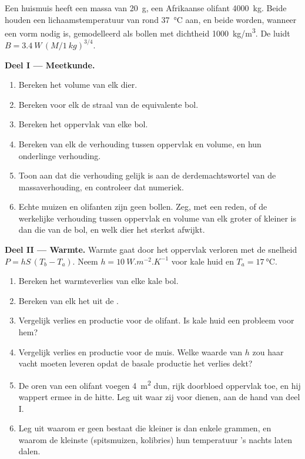 \begin{problem}
\label{pb:b1:organism-environment:1}
Een huismuis heeft een massa van \qty{20}{g}, een Afrikaanse olifant
\qty{4000}{kg}. Beide houden een lichaamstemperatuur van rond \qty{37}{\celsius}
aan, en beide worden, wanneer een vorm nodig is, gemodelleerd als bollen met
dichtheid \qty{1000}{kg/m^3}. De  luidt $B = \qty{3.4}{W}\,(M/\qty{1}{kg})^{3/4}$.

\medskip
\noindent\textbf{Deel I --- Meetkunde.}
\begin{enumerate}
  \item Bereken het volume van elk dier.
  \item Bereken voor elk de straal van de equivalente bol.
  \item Bereken het oppervlak van elke bol.
  \item Bereken van elk de verhouding tussen oppervlak en volume, en hun
        onderlinge verhouding.
  \item Toon aan dat die verhouding gelijk is aan de derdemachtswortel van de
        massaverhouding, en controleer dat numeriek.
  \item Echte muizen en olifanten zijn geen bollen. Zeg, met een reden, of de
        werkelijke verhouding tussen oppervlak en volume van elk groter of
        kleiner is dan die van de bol, en welk dier het sterkst afwijkt.
\end{enumerate}

\medskip
\noindent\textbf{Deel II --- Warmte.}
Warmte gaat door het oppervlak verloren met de snelheid $P = hS\,(T_b - T_a)$.
Neem $h = \qty{10}{W.m^{-2}.K^{-1}}$ voor kale huid en $T_a =
\qty{17}{\celsius}$.
\begin{enumerate}[resume]
  \item Bereken het warmteverlies van elke kale bol.
  \item Bereken van elk het  uit de .
  \item Vergelijk verlies en productie voor de olifant. Is kale huid een
        probleem voor hem?
  \item Vergelijk verlies en productie voor de muis. Welke waarde van $h$ zou
        haar vacht moeten leveren opdat de basale productie het verlies dekt?
  \item De oren van een olifant voegen \qty{4}{m^2} dun, rijk doorbloed
        oppervlak toe, en hij wappert ermee in de hitte. Leg uit waar zij voor
        dienen, aan de hand van deel I.
  \item Leg uit waarom er geen  bestaat die kleiner is dan enkele
        grammen, en waarom de kleinste (spitsmuizen, kolibries) hun temperatuur
        's nachts laten dalen.
\end{enumerate}


\end{problem}
